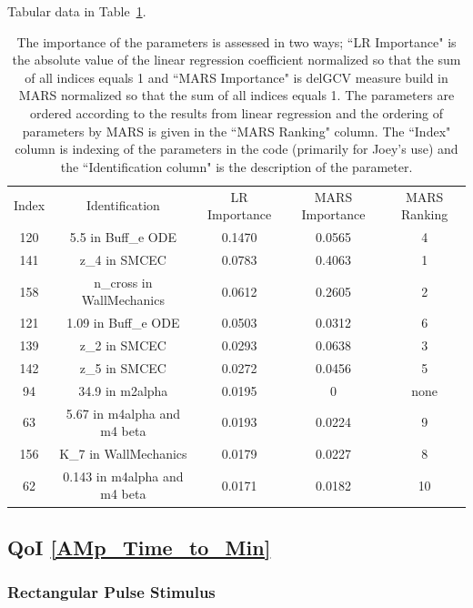 \documentclass[12pt]{article}
\numberwithin{equation}{section}
\begin{document}
Tabular data in Table~\ref{qoi_AM_AMp_Min_ex}.
 
\begin{table}[h]
\centering
\begin{tabular}{ccccc}
Index & Identification & LR Importance & MARS Importance & MARS Ranking \\
120 & 5.5 in Buff\_e ODE & 0.1470 & 0.0565 & 4\\
141 & z\_4 in SMCEC & 0.0783 & 0.4063 & 1\\
158 & n\_cross in WallMechanics & 0.0612 & 0.2605 & 2\\
121 & 1.09 in Buff\_e ODE & 0.0503 & 0.0312 & 6\\
139 & z\_2 in SMCEC & 0.0293 & 0.0638 & 3\\ 
142 & z\_5 in SMCEC & 0.0272 & 0.0456 & 5\\ 
94 & 34.9 in m2alpha & 0.0195 & 0 & none \\
63 &   5.67 in m4alpha and m4 beta &  0.0193 &  0.0224 & 9\\
156 & K\_7 in WallMechanics & 0.0179 & 0.0227 & 8\\
62 & 0.143 in m4alpha and m4 beta & 0.0171 & 0.0182 & 10\\
\end{tabular}
\caption{The importance of the parameters is assessed in two ways; ``LR Importance" is the absolute value of the linear regression coefficient normalized so that the sum of all indices equals 1 and ``MARS Importance" is delGCV measure build in MARS normalized so that the sum of all indices equals 1. The parameters are ordered according to the results from linear regression and the ordering of parameters by MARS is given in the ``MARS Ranking" column. The ``Index" column is indexing of the parameters in the code (primarily for Joey's use) and the ``Identification column" is the description of the parameter.}
\label{qoi_AM_AMp_Min_ex}
\end{table}

\newpage
\subsection{QoI \eqref{AMp_Time_to_Min}}

\subsubsection{Rectangular Pulse Stimulus}
\end{document}
